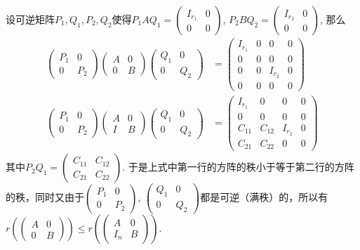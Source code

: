 设可逆矩阵$P_1,Q_1,P_2,Q_2$使得$P_1AQ_1 = \begin{pmatrix} I_{r_1} & 0 \\ 0 & 0 \end{pmatrix}$, $P_2BQ_2 = \begin{pmatrix} I_{r_2} & 0 \\ 0 & 0 \end{pmatrix}$, 那么
\begin{align*}
\begin{pmatrix} P_1 & 0 \\ 0 & P_2 \end{pmatrix} \begin{pmatrix} A & 0 \\ 0 & B \end{pmatrix} \begin{pmatrix} Q_1 & 0 \\ 0 & Q_2 \end{pmatrix} & = \begin{pmatrix} I_{r_1} & 0 & 0 & 0 \\ 0 & 0 & 0 & 0 \\ 0 & 0 & I_{r_2} & 0 \\ 0 & 0 & 0 & 0 \end{pmatrix} \\
\begin{pmatrix} P_1 & 0 \\ 0 & P_2 \end{pmatrix} \begin{pmatrix} A & 0 \\ I & B \end{pmatrix} \begin{pmatrix} Q_1 & 0 \\ 0 & Q_2 \end{pmatrix} & = \begin{pmatrix} I_{r_1} & 0 & 0 & 0 \\ 0 & 0 & 0 & 0 \\ C_{11} & C_{12} & I_{r_2} & 0 \\ C_{21} & C_{22} & 0 & 0 \end{pmatrix}
\end{align*}
其中$P_2Q_1 = \begin{pmatrix} C_{11} & C_{12} \\ C_{21} & C_{22} \end{pmatrix}$. 于是上式中第一行的方阵的秩小于等于第二行的方阵的秩，同时又由于$\begin{pmatrix} P_1 & 0 \\ 0 & P_2 \end{pmatrix}$, $\begin{pmatrix} Q_1 & 0 \\ 0 & Q_2 \end{pmatrix}$都是可逆（满秩）的，所以有$r(\begin{pmatrix} A & 0 \\ 0 & B \end{pmatrix}) \leqslant r(\begin{pmatrix} A & 0 \\ I_n & B \end{pmatrix})$.


